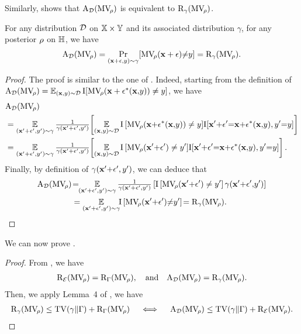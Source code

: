 \begin{noaddcontents}
Similarly,  shows that $\text{A}_{\mathcal{D}}(\text{MV}_{\!\rho})$ is equivalent to $\text{R}_{\gamma}(\text{MV}_{\!\rho})$.
\begin{lemma} 
For any distribution $\mathcal{D}$ on $\mathbb{X}\times\mathbb{Y}$ and its associated distribution $\gamma$, for any posterior $\rho$ on $\mathbb{H}$, we have
\label{chap:mv-robustness:lemma:Pi}
\begin{align*}
    \text{A}_{\mathcal{D}}(\text{MV}_{\!\rho}) = \Pr_{(\mathbf{x}+\epsilon{,}y){\sim}\gamma}\!\left[ \text{MV}_{\!\rho}(\mathbf{x}+\epsilon){\ne}y\right] = \text{R}_{\gamma}(\text{MV}_{\!\rho}).
\end{align*}
\end{lemma}
\begin{proof} 
The proof is similar to the one of .
Indeed, starting from the definition of $\text{A}_{\mathcal{D}}(\text{MV}_{\!\rho}) = \operatorname*{\mathbb{E}}_{(\mathbf{x},y)\sim\mathcal{D}}\operatorname{I}\!\left[\text{MV}_{\!\rho}(\mathbf{x}+\epsilon^*(\mathbf{x}{,}y)) \neq y\right]$, we have
\begin{align*}
    &\RiskA_{\D}(\MVQ)\\
    &= \EE_{(\x'{+}\epsilon', \y')\sim \gamma}\tfrac{1}{\gamma(\x'{+}\epsilon', \y')}\!\LB\EE_{(\x,\y)\sim\D}\indic\LB\MVQ(\x{+}\epsilon^*(\x{,}\y))\ne \y\RB\!\indic\!\LB \x'{+}\epsilon'{=}\x{+}\epsilon^*(\x{,}\y), \y'{=}y\RB\RB\\
    &= \EE_{(\x'+\epsilon', \y')\sim\gamma}\tfrac{1}{\gamma(\x'{+}\epsilon', \y')}\!\LB\EE_{(\x{,}\y)\sim\D}\indic\LB\MVQ(\x'{+}\epsilon')\ne \y'\RB\!\indic\!\LB \x'{+}\epsilon'{=}\x{+}\epsilon^*(\x{,}\y), \y'{=}y\RB\RB.
\end{align*}
Finally, by definition of $\gamma(\mathbf{x}'{+}\epsilon', y')$, we can deduce that
\begin{align*}
    \RiskA_{\D}(\MVQ) &\!=\!\!\EE_{(\x'+\epsilon', \y')\sim \gamma}\tfrac{1}{\gamma(\x'+\epsilon', \y')}\LB\indic\LB\MVQ(\x'{+}\epsilon')\ne \y'\RB\gamma(\x'{+}\epsilon'{,}\y')\RB\\
    &= \EE_{(\x'+\epsilon', \y')\sim\gamma}\!\!\indic\LB\MVQ(\x'{+}\epsilon'){\ne}\y'\RB\! = \Risk_{\gamma}(\MVQ).
\end{align*}
\end{proof}

We can now prove .

\propavgworstrisk*
\begin{proof}
    From , we have 
    \begin{align*}
        \text{R}_{{\mathcal{E}}}(\text{MV}_{\!\rho}) = \text{R}_{\Gamma}(\text{MV}_{\!\rho}), \text{\quad and\quad} \text{A}_{\mathcal{D}}(\text{MV}_{\!\rho})=\text{R}_{\gamma}(\text{MV}_{\!\rho}).
    \end{align*}
    Then, we apply Lemma~4 of \citet{OhnishiHonorio2021}, we have
    \begin{align*}
    \text{R}_{\gamma}(\text{MV}_{\!\rho}) \le {\rm TV}(\gamma\|\Gamma) + \text{R}_{\Gamma}(\text{MV}_{\!\rho})\quad 
    \iff \quad \text{A}_{\mathcal{D}}(\text{MV}_{\!\rho}) \le {\rm TV}(\gamma\|\Gamma) + \text{R}_{{\mathcal{E}}}(\text{MV}_{\!\rho}).
    \end{align*}
\end{proof}


\end{noaddcontents}
